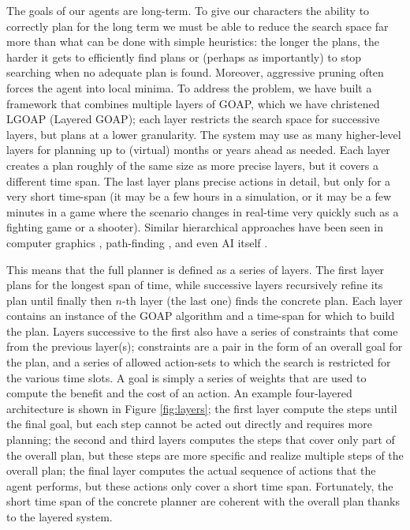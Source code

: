 The goals of our agents are long-term. To give our characters the ability to correctly plan for the long term we must be able to reduce the search space far more than what can be done with simple heuristics: the longer the plans, the harder it gets to efficiently find plans or (perhaps as importantly) to stop searching when no adequate plan is found. Moreover, aggressive pruning often forces the agent into local minima. To address the problem, we have built a framework that combines multiple layers of GOAP, which we have christened LGOAP (Layered GOAP); each layer restricts the search space for successive layers, but plans at a lower granularity. The system may use as many higher-level layers for planning up to (virtual) months or years ahead as needed. Each layer creates a plan roughly of the same size as more precise layers, but it covers a different time span. The last layer plans precise actions in detail, but only for a very short time-span (it may be a few hours in a simulation, or it may be a few minutes in a game where the scenario changes in real-time very quickly such as a fighting game or a shooter). Similar hierarchical approaches have been seen in computer graphics \cite{APPENDIX_C_CLIPMAPS}, path-finding \cite{APPENDIX_C_HIERARCHICAL_PATHFINDING}, and even AI itself \cite{APPENDIX_C_HIERARCHICAL_AI}.

This means that the full planner is defined as a series of layers. The first layer plans for the longest span of time, while successive layers recursively refine its plan until finally then $n$-th layer (the last one) finds the concrete plan. Each layer contains an instance of the GOAP algorithm and a time-span for which to build the plan. Layers successive to the first also have a series of constraints that come from the previous layer(s); constraints are a pair in the form of an overall goal for the plan, and a series of allowed action-sets to which the search is restricted for the various time slots. A goal is simply a series of weights that are used to compute the benefit and the cost of an action. An example four-layered architecture is shown in Figure \ref{fig:layers}; the first layer compute the steps until the final goal, but each step cannot be acted out directly and requires more planning; the second and third layers computes the steps that cover only part of the overall plan, but these steps are more specific and realize multiple steps of the overall plan; the final layer computes the actual sequence of actions that the agent performs, but these actions only cover a short time span. Fortunately, the short time span of the concrete planner are coherent with the overall plan thanks to the layered system.

